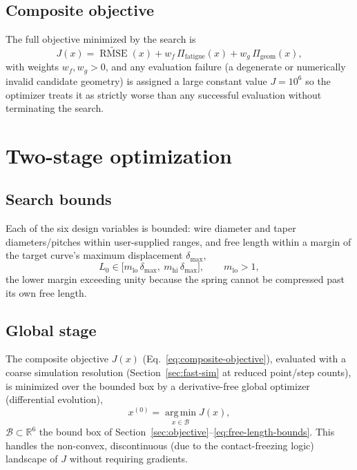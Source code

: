 \documentclass[11pt]{article}
\DeclareMathOperator{\RMSE}{RMSE}
\begin{document}
\subsection{Composite objective}

The full objective minimized by the search is
\begin{equation}
J(x) = \widetilde{\RMSE}(x) + w_f\,\Pi_{\mathrm{fatigue}}(x) + w_g\,\Pi_{\mathrm{geom}}(x),
\label{eq:composite-objective}
\end{equation}
with weights $w_f,w_g>0$, and any evaluation failure (a degenerate or
numerically invalid candidate geometry) is assigned a large constant
value $J=10^{6}$ so the optimizer treats it as strictly worse than any
successful evaluation without terminating the search.

\section{Two-stage optimization}
\label{sec:optimization}

\subsection{Search bounds}

Each of the six design variables is bounded: wire diameter and taper
diameters/pitches within user-supplied ranges, and free length within a
margin of the target curve's maximum displacement $\delta_{\max}$,
\begin{equation}
L_0 \in \big[m_{\mathrm{lo}}\,\delta_{\max},\ m_{\mathrm{hi}}\,\delta_{\max}\big], \qquad m_{\mathrm{lo}} > 1,
\label{eq:free-length-bounds}
\end{equation}
the lower margin exceeding unity because the spring cannot be compressed
past its own free length.

\subsection{Global stage}

The composite objective $J(x)$ (Eq.~\eqref{eq:composite-objective}),
evaluated with a coarse simulation resolution
(Section~\ref{sec:fast-sim} at reduced point/step counts), is minimized
over the bounded box by a derivative-free global optimizer (differential
evolution),
\begin{equation}
x^{(0)} = \operatorname*{arg\,min}_{x \in \mathcal{B}} J(x),
\label{eq:global-stage}
\end{equation}
$\mathcal{B}\subset\mathbb{R}^6$ the bound box of
Section~\ref{sec:objective}--\ref{eq:free-length-bounds}. This handles
the non-convex, discontinuous (due to the contact-freezing logic)
landscape of $J$ without requiring gradients.
\end{document}

